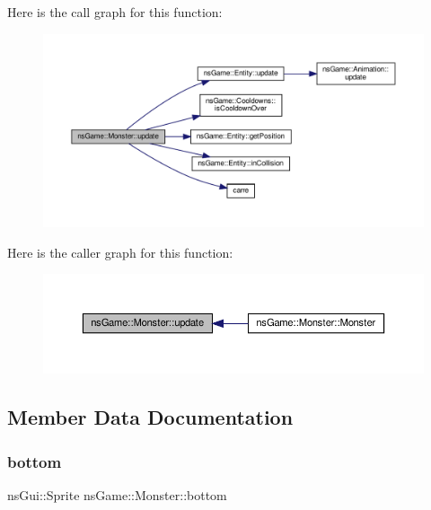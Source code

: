 Here is the call graph for this function\+:\nopagebreak
\begin{figure}[H]
\begin{center}
\leavevmode
\includegraphics[width=350pt]{classns_game_1_1_monster_a0fa9eca417938bdbf9f12befd4531b34_cgraph}
\end{center}
\end{figure}
Here is the caller graph for this function\+:\nopagebreak
\begin{figure}[H]
\begin{center}
\leavevmode
\includegraphics[width=350pt]{classns_game_1_1_monster_a0fa9eca417938bdbf9f12befd4531b34_icgraph}
\end{center}
\end{figure}


\subsection{Member Data Documentation}
\mbox{\label{classns_game_1_1_monster_a1ce7159819ef30be7f9efed781f7ce49}} 
\subsubsection{\texorpdfstring{bottom}{bottom}}
{\footnotesize\ttfamily ns\+Gui\+::\+Sprite ns\+Game\+::\+Monster\+::bottom}



